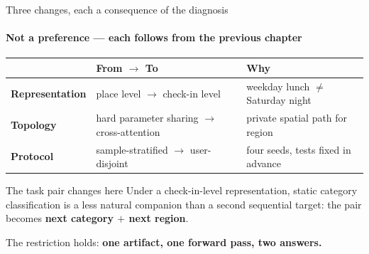 \documentclass{beamer}
\begin{document}
\begin{frame}{Three changes, each a consequence of the diagnosis}
    \framesubtitle{Not a preference --- each follows from the previous chapter}

    {\small
    \setlength{\tabcolsep}{4pt}
    \renewcommand{\arraystretch}{1.1}\begin{tabular}{@{}l l l@{}}
        \toprule
                                & \textbf{From $\rightarrow$ To}                     & \textbf{Why}                          \\
        \midrule
        \textbf{Representation} & place level $\rightarrow$ \alert{check-in level}   & weekday lunch $\neq$ Saturday night   \\
        \textbf{Topology}       & hard parameter sharing $\rightarrow$ \alert{cross-attention} & private spatial path for region \\
        \textbf{Protocol}       & sample-stratified $\rightarrow$ \alert{user-disjoint} & four seeds, tests fixed in advance \\
        \bottomrule
    \end{tabular}}

    \medskip
    \begin{alertblock}{The task pair changes here}
        \small
        Under a check-in-level representation, static category classification is a less natural
        companion than a second sequential target: the pair becomes
        \textbf{next category $+$ next region}.
        \smallskip

        The restriction holds: \textbf{one artifact, one forward pass, two answers.}
    \end{alertblock}
\end{frame}
\end{document}
